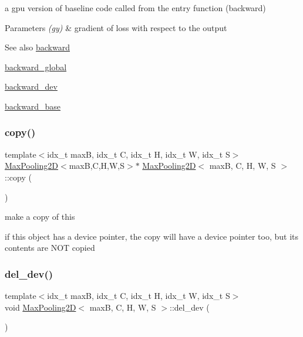 a gpu version of baseline code called from the entry function (backward) 


\begin{DoxyParams}{Parameters}
{\em (gy)} & gradient of loss with respect to the output \\
\hline
\end{DoxyParams}
\begin{DoxySeeAlso}{See also}
\hyperlink{structMaxPooling2D_ae0ad0f868dcf5f976f4dd99dd91e2f91}{backward} 

\hyperlink{softmaxcrossentropy_8h_a47d56a9a23e08247b227f4aac17413e0}{backward\+\_\+global} 

\hyperlink{structMaxPooling2D_ad54e972c24822a97aac4f43066d25db8}{backward\+\_\+dev} 

\hyperlink{structMaxPooling2D_a3a2ce37cba46cc7cfd219e55bb3c2f29}{backward\+\_\+base} 
\end{DoxySeeAlso}
\mbox{\label{structMaxPooling2D_a84452150daaa577f3a13d13e429d1eca}} 
\subsubsection{\texorpdfstring{copy()}{copy()}}
{\footnotesize\ttfamily template$<$idx\+\_\+t maxB, idx\+\_\+t C, idx\+\_\+t H, idx\+\_\+t W, idx\+\_\+t S$>$ \\
\hyperlink{structMaxPooling2D}{Max\+Pooling2D}$<$maxB,C,H,W,S$>$$\ast$ \hyperlink{structMaxPooling2D}{Max\+Pooling2D}$<$ maxB, C, H, W, S $>$\+::copy (\begin{DoxyParamCaption}{ }\end{DoxyParamCaption})\hspace{0.3cm}{\ttfamily [inline]}}



make a copy of this 

if this object has a device pointer, the copy will have a device pointer too, but its contents are N\+OT copied \mbox{\label{structMaxPooling2D_a5d3cd9d8a476ae96cb7f86b5a0409f72}} 
\subsubsection{\texorpdfstring{del\+\_\+dev()}{del\_dev()}}
{\footnotesize\ttfamily template$<$idx\+\_\+t maxB, idx\+\_\+t C, idx\+\_\+t H, idx\+\_\+t W, idx\+\_\+t S$>$ \\
void \hyperlink{structMaxPooling2D}{Max\+Pooling2D}$<$ maxB, C, H, W, S $>$\+::del\+\_\+dev (\begin{DoxyParamCaption}{ }\end{DoxyParamCaption})\hspace{0.3cm}{\ttfamily [inline]}}



